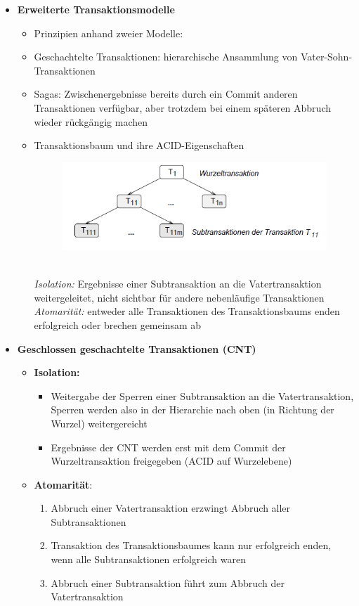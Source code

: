 \begin{itemize}
\begin{itemize}
		\item \textbf{Erweiterte Transaktionsmodelle}
		\begin{itemize}
			\item Prinzipien anhand zweier Modelle:
			\item Geschachtelte Transaktionen: hierarchische Ansammlung von Vater-Sohn-Transaktionen
			\item Sagas: Zwischenergebnisse bereits durch ein Commit anderen Transaktionen verfügbar, aber trotzdem bei einem späteren Abbruch wieder rückgängig machen
			\item Transaktionsbaum und ihre ACID-Eigenschaften
			\begin{figure}[!h]
				\centering
				\includegraphics[scale=0.7]{img/transaction_tree.png}
			\end{figure}\\
			\textit{Isolation:} Ergebnisse einer Subtransaktion an die Vatertransaktion weitergeleitet, nicht sichtbar für andere nebenläufige Transaktionen\\
			\textit{Atomarität:} entweder alle Transaktionen des Transaktionsbaums enden erfolgreich oder brechen gemeinsam ab
		\end{itemize}
		
		\item \textbf{Geschlossen geschachtelte Transaktionen (CNT)}
		\begin{itemize}
			\item \textbf{Isolation:}
			\begin{itemize}
				\item Weitergabe der Sperren einer Subtransaktion an die Vatertransaktion, Sperren werden also in der Hierarchie nach oben (in Richtung der Wurzel) weitergereicht
				\item Ergebnisse der CNT werden erst mit dem Commit der Wurzeltransaktion freigegeben (ACID auf Wurzelebene)
			\end{itemize}
			\item \textbf{Atomarität}:
			\begin{enumerate}
				\item Abbruch einer Vatertransaktion erzwingt Abbruch aller Subtransaktionen
				\item Transaktion des Transaktionsbaumes kann nur erfolgreich enden, wenn alle Subtransaktionen erfolgreich waren
				\item Abbruch einer Subtransaktion führt zum Abbruch der Vatertransaktion
			\end{enumerate}
		\end{itemize}
		

\end{itemize}
\end{itemize}
